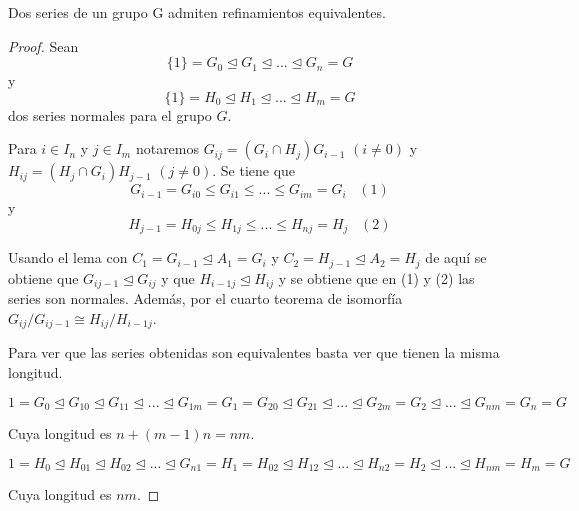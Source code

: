 \begin{theorem}
Dos series de un grupo G admiten refinamientos equivalentes.
\end{theorem}
\begin{proof}
Sean $$\{1\} = G_0 \trianglelefteq G_1 \trianglelefteq ... \trianglelefteq G_n = G$$ y $$\{1\} = H_0 \trianglelefteq H_1 \trianglelefteq ... \trianglelefteq H_m = G$$ dos series normales para el grupo $G$. 

Para $i \in I_n$ y $j \in I_m$ notaremos $G_{ij} = (G_i \cap H_j)G_{i-1}$ $(i \neq 0)$ y $H_{ij} = (H_{j} \cap G_i) H_{j-1}$ $(j \neq 0)$. Se tiene que $$G_{i-1} = G_{i0} \le G_{i1} \le ... \le G_{im} = G_i \;\;\; (1)$$ y $$H_{j-1} = H_{0j} \le H_{1j} \le ... \le H_{nj} = H_j \;\;\; (2)$$

Usando el lema con $C_1 = G_{i-1} \trianglelefteq A_1 = G_i$ y $C_2 = H_{j-1} \trianglelefteq A_2 = H_j$ de aquí se obtiene que $G_{ij-1} \trianglelefteq G_{ij}$ y que $H_{i-1j} \trianglelefteq H_{ij}$ y se obtiene que en (1) y (2) las series son normales. Además, por el cuarto teorema de isomorfía $G_{ij}/G_{ij-1} \cong H_{ij}/H_{i-1j}$.

Para ver que las series obtenidas son equivalentes basta ver que tienen la misma longitud. 

$1 = G_0 \trianglelefteq G_{10} \trianglelefteq G_{11} \trianglelefteq ... \trianglelefteq G_{1m} = G_1 = G_{20} \trianglelefteq G_{21} \trianglelefteq ... \trianglelefteq G_{2m} = G_2 \trianglelefteq ... \trianglelefteq G_{nm} = G_n = G$

Cuya longitud es $n+(m-1)n = nm$.

$1 = H_0 \trianglelefteq H_{01} \trianglelefteq H_{02} \trianglelefteq ... \trianglelefteq G_{n1} = H_1 = H_{02} \trianglelefteq H_{12} \trianglelefteq ... \trianglelefteq H_{n2} = H_2 \trianglelefteq ... \trianglelefteq H_{nm} = H_m = G$

Cuya longitud es $nm$.
\end{proof}



